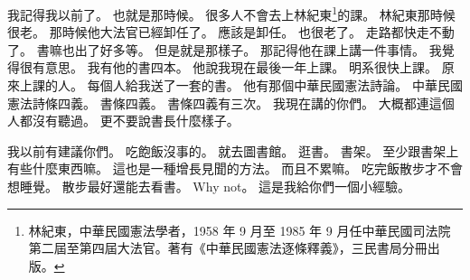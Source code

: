 \hypertarget{w01:cue:3628}{}我記得我以前了。
\hypertarget{w01:cue:3629}{}也就是那時候。
\hypertarget{w01:cue:3630}{}很多人不會去上林紀東\footnote{林紀東，中華民國憲法學者，1958 年 9 月至 1985 年 9 月任中華民國司法院第二屆至第四屆大法官。著有《中華民國憲法逐條釋義》，三民書局分冊出版。}的課。
\hypertarget{w01:cue:3631}{}林紀東那時候很老。
\hypertarget{w01:cue:3632}{}那時候他大法官已經卸任了。
\hypertarget{w01:cue:3633}{}應該是卸任。
\hypertarget{w01:cue:3634}{}也很老了。
\hypertarget{w01:cue:3635}{}走路都快走不動了。
\hypertarget{w01:cue:3636}{}書嘛也出了好多等。
\hypertarget{w01:cue:3637}{}但是就是那樣子。
\hypertarget{w01:cue:3638}{}那記得他在課上講一件事情。
\hypertarget{w01:cue:3639}{}我覺得很有意思。
\hypertarget{w01:cue:3640}{}我有他的書四本。
\hypertarget{w01:cue:3641}{}他說我現在最後一年上課。
\hypertarget{w01:cue:3642}{}明系很快上課。
\hypertarget{w01:cue:3643}{}原來上課的人。
\hypertarget{w01:cue:3644}{}每個人給我送了一套的書。
\hypertarget{w01:cue:3645}{}他有那個中華民國憲法詩論。
\hypertarget{w01:cue:3646}{}中華民國憲法詩條四義。
\hypertarget{w01:cue:3647}{}書條四義。
\hypertarget{w01:cue:3648}{}書條四義有三次。
\hypertarget{w01:cue:3649}{}我現在講的你們。
\hypertarget{w01:cue:3650}{}大概都連這個人都沒有聽過。
\hypertarget{w01:cue:3651}{}更不要說書長什麼樣子。

\hypertarget{w01:cue:3652}{}我以前有建議你們。
\hypertarget{w01:cue:3653}{}吃飽飯沒事的。
\hypertarget{w01:cue:3654}{}就去圖書館。
\hypertarget{w01:cue:3655}{}逛書。
\hypertarget{w01:cue:3656}{}書架。
\hypertarget{w01:cue:3657}{}至少跟書架上有些什麼東西嘛。
\hypertarget{w01:cue:3658}{}這也是一種增長見聞的方法。
\hypertarget{w01:cue:3659}{}而且不累嘛。
\hypertarget{w01:cue:3660}{}吃完飯散步才不會想睡覺。
\hypertarget{w01:cue:3661}{}散步最好還能去看書。
\hypertarget{w01:cue:3662}{}Why not。
\hypertarget{w01:cue:3663}{}這是我給你們一個小經驗。

